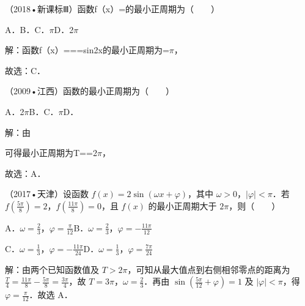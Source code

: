 \begin{question}
（2018•新课标Ⅲ）函数f（x）=的最小正周期为（　　）\par
A．\qquad{}B．\qquad{}C．\ensuremath{\pi}\qquad{}D．2\ensuremath{\pi}\par
\begin{solution}
解：函数f（x）===sin2x的最小正周期为=\ensuremath{\pi}，\par
故选：C．\par
\end{solution}
\end{question}

\begin{question}
（2009•江西）函数的最小正周期为（　　）\par
A．2\ensuremath{\pi}\qquad{}B．\qquad{}C．\ensuremath{\pi}\qquad{}D．\par
\begin{solution}
解：由\par
可得最小正周期为T==2\ensuremath{\pi}，\par
故选：A．\par
\end{solution}
\end{question}

\begin{question}
（2017•天津）设函数 $f(x)=2\sin(\omega x+\varphi)$，其中 $\omega>0$，$|\varphi|<\pi$．若 $f(\frac{5\pi}{8})=2$，$f(\frac{11\pi}{8})=0$，且 $f(x)$ 的最小正周期大于 $2\pi$，则（　　）\par
A．$\omega=\frac23$，$\varphi=\frac{\pi}{12}$\qquad B．$\omega=\frac23$，$\varphi=-\frac{11\pi}{12}$\par
C．$\omega=\frac13$，$\varphi=-\frac{11\pi}{24}$\qquad D．$\omega=\frac13$，$\varphi=\frac{7\pi}{24}$\par
\begin{solution}
解：由两个已知函数值及 $T>2\pi$，可知从最大值点到右侧相邻零点的距离为 $\frac T4=\frac{11\pi}{8}-\frac{5\pi}{8}=\frac{3\pi}{4}$，故 $T=3\pi$，$\omega=\frac23$．再由 $\sin(\frac{5\pi}{12}+\varphi)=1$ 及 $|\varphi|<\pi$，得 $\varphi=\frac{\pi}{12}$．故选 A．\par
\end{solution}
\end{question}

